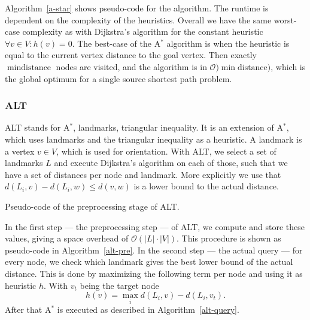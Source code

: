             Algorithm~\ref{a-star} shows pseudo-code for the algorithm. The runtime is dependent on the complexity of the heuristics.
            Overall we have the same worst-case complexity as with Dijkstra's algorithm for the constant heuristic
            $\forall v \in V: h(v) = 0$. 
            The best-case of the A$^*$ algorithm is when the heuristic is equal to the current vertex distance to the goal vertex.  
            Then exactly $\min \text{distance}$ nodes are visited, and the algorithm is in $\mathcal{O})\min \text{distance})$, which is the global optimum for a single source shortest path problem.

        \subsubsection*{ALT}
            ALT stands for A$^*$, landmarks, triangular inequality. 
            It is an extension of A$^*$, which uses landmarks and the triangular inequality as a heuristic. 
            A landmark is a vertex $v \in V$, which is used for orientation. 
            With ALT, we select a set of landmarks $L$ and execute Dijkstra's algorithm on each of those, such that we have a set of distances per node and landmark.
            More explicitly we use that $d(L_i, v) - d(L_i, w) \leq d(v,w)$ is a lower bound to the actual distance.
            
            \begin{algorithm}[htp]
                \hrulealg
            \caption{Pseudo-code of the preprocessing stage of ALT.}\label{alt-pre}
            \end{algorithm}
            
            In the first step --- the preprocessing step --- of ALT, we compute and store these values, giving a space overhead of $\mathcal{O}(|L| \cdot |V|)$. 
            This procedure is shown as pseudo-code in Algorithm~\ref{alt-pre}.
            In the second step --- the actual query --- for every node, we check which landmark gives the best lower bound of the actual distance.
            This is done by maximizing the following term per node and using it as heuristic $h$.
            With $v_t$ being the target node
            \[ h(v) = \max_i d(L_i, v) - d(L_i, v_t). \]
            After that A$^*$ is executed as described in Algorithm~\ref{alt-query}.
            
